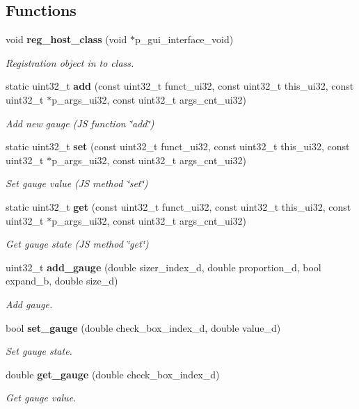 \subsection*{Functions}
\begin{DoxyCompactItemize}
\item 
void \textbf{ reg\+\_\+host\+\_\+class} (void $\ast$p\+\_\+gui\+\_\+interface\+\_\+void)
\begin{DoxyCompactList}\small\item\em Registration object in to class. \end{DoxyCompactList}\item 
static uint32\+\_\+t \textbf{ add} (const uint32\+\_\+t funct\+\_\+ui32, const uint32\+\_\+t this\+\_\+ui32, const uint32\+\_\+t $\ast$p\+\_\+args\+\_\+ui32, const uint32\+\_\+t args\+\_\+cnt\+\_\+ui32)
\begin{DoxyCompactList}\small\item\em Add new gauge (JS function \char`\"{}add\char`\"{}) \end{DoxyCompactList}\item 
static uint32\+\_\+t \textbf{ set} (const uint32\+\_\+t funct\+\_\+ui32, const uint32\+\_\+t this\+\_\+ui32, const uint32\+\_\+t $\ast$p\+\_\+args\+\_\+ui32, const uint32\+\_\+t args\+\_\+cnt\+\_\+ui32)
\begin{DoxyCompactList}\small\item\em Set gauge value (JS method \char`\"{}set\char`\"{}) \end{DoxyCompactList}\item 
static uint32\+\_\+t \textbf{ get} (const uint32\+\_\+t funct\+\_\+ui32, const uint32\+\_\+t this\+\_\+ui32, const uint32\+\_\+t $\ast$p\+\_\+args\+\_\+ui32, const uint32\+\_\+t args\+\_\+cnt\+\_\+ui32)
\begin{DoxyCompactList}\small\item\em Get gauge state (JS method \char`\"{}get\char`\"{}) \end{DoxyCompactList}\item 
uint32\+\_\+t \textbf{ add\+\_\+gauge} (double sizer\+\_\+index\+\_\+d, double proportion\+\_\+d, bool expand\+\_\+b, double size\+\_\+d)
\begin{DoxyCompactList}\small\item\em Add gauge. \end{DoxyCompactList}\item 
bool \textbf{ set\+\_\+gauge} (double check\+\_\+box\+\_\+index\+\_\+d, double value\+\_\+d)
\begin{DoxyCompactList}\small\item\em Set gauge state. \end{DoxyCompactList}\item 
double \textbf{ get\+\_\+gauge} (double check\+\_\+box\+\_\+index\+\_\+d)
\begin{DoxyCompactList}\small\item\em Get gauge value. \end{DoxyCompactList}\end{DoxyCompactItemize}


